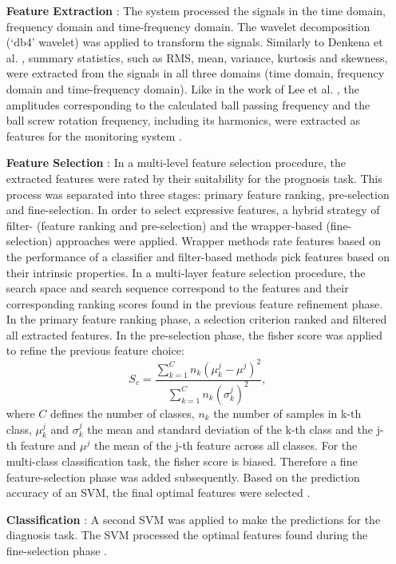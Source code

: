 \begin{itemize}
    \item [\textbf{Feature Extraction}]: The system processed the signals in the time domain, frequency domain and time-frequency domain. The wavelet decomposition (‘db4’ wavelet) was applied to transform the signals. Similarly to Denkena et al. \cite{Denkena2021}, summary statistics, such as RMS, mean, variance, kurtosis and skewness, were extracted from the signals in all three domains (time domain, frequency domain and time-frequency domain). Like in the work of Lee et al. \cite{Lee2015}, the amplitudes corresponding to the calculated ball passing frequency and the ball screw rotation frequency, including its harmonics, were extracted as features for the monitoring system \cite{LiPin2018}.
    \item [\textbf{Feature Selection}]: In a multi-level feature selection procedure, the extracted features were rated by their suitability for the prognosis task. This process was separated into three stages: primary feature ranking, pre-selection and fine-selection. In order to select expressive features, a hybrid strategy of filter- (feature ranking and pre-selection) and the wrapper-based (fine-selection) approaches were applied. Wrapper methods rate features based on the performance of a classifier and filter-based methods pick features based on their intrinsic properties. In a multi-layer feature selection procedure, the search space and search sequence correspond to the features and their corresponding ranking scores found in the previous feature refinement phase. In the primary feature ranking phase, a selection criterion ranked and filtered all extracted features. In the pre-selection phase, the fisher score was applied to refine the previous feature choice:
    \begin{equation}
        S_{c} = \frac{\sum_{k=1}^{C} n_{k}(\mu_{k}^{j}-\mu^{j})^{2}}{\sum_{k=1}^{C}n_{k}(\sigma_{k}^{j})^{2}},
    \end{equation}
    where $C$ defines the number of classes, $n_{k}$ the number of samples in k-th class, $\mu_{k}^{j}$ and $\sigma_{k}^{j}$ the mean and standard deviation of the k-th class and the j-th feature and $\mu^{j}$ the mean of the j-th feature across all classes. For the multi-class classification task, the fisher score is biased. Therefore a fine feature-selection phase was added subsequently. Based on the prediction accuracy of an SVM, the final optimal features were selected \cite{LiPin2018}.
    \item [\textbf{Classification}]: A second SVM was applied to make the predictions for the diagnosis task. The SVM processed the optimal features found during the fine-selection phase \cite{LiPin2018}. 
\end{itemize}

